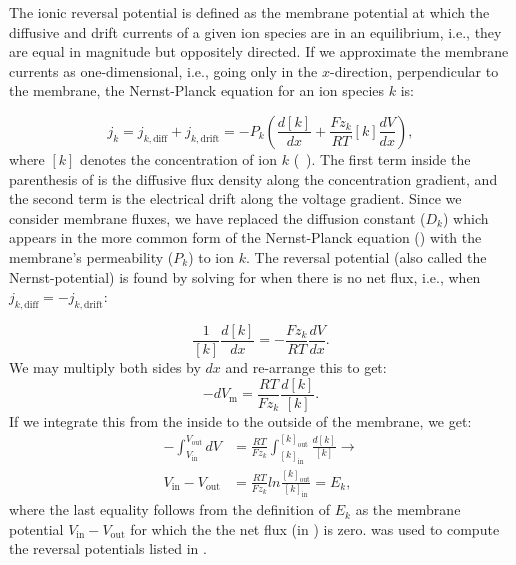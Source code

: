 The ionic reversal potential  is defined as the membrane potential at which the diffusive and drift currents of a given ion species are in an equilibrium, i.e., they are equal in magnitude but oppositely directed. If we approximate the membrane currents as one-dimensional, i.e., going only in the $x$-direction, perpendicular to the membrane, the Nernst-Planck equation for an ion species $k$ is:

\begin{equation}
j_k = j_{k,\text{diff}} + j_{k,\text{drift}} 
=  - P_k \left( \frac{d[k]}{dx} +  \frac{Fz_k}{RT}  [k] \frac{dV}{dx} \right), 
\label{eq:Neuron:NP1D}
\end{equation}
where  $[k]$ denotes the concentration of ion $k$ (\si{\milli\molar}). The first term inside the parenthesis of  is the diffusive flux density along the concentration gradient, and the second term is the electrical drift along the voltage gradient. Since we consider membrane fluxes, we have replaced the diffusion constant ($D_k$) which appears in the more common form of the Nernst-Planck equation () with the membrane's permeability ($P_k$) to ion $k$. The reversal potential (also called the Nernst-potential) is found by solving for when there is no net flux, i.e., when  $j_{k,\text{diff}} = - j_{k,\text{drift}}$:

\begin{equation}
\frac{1}{[k]} \frac{d[k]}{dx} = - \frac{Fz_k}{RT}  \frac{dV}{dx}.
\end{equation}
We may multiply both sides by $dx$ and re-arrange this to get:
\begin{equation}
-dV_\mathrm{m} = \frac{RT}{Fz_k}  \frac{d[k]}{[k]}.
\end{equation}
If we integrate this from the inside to the outside of the membrane, we get:
\begin{align}
-\int_{V_{\text{in}}}^{V_{\text{out}}}  dV &= \frac{RT}{Fz_k}  \int_{[k]_{\text{in}}}^{[k]_{\text{out}}} \frac{d[k]}{[k]} \rightarrow \\
V_{\text{in}}-V_{\text{out}} &= \frac{RT}{Fz_k} ln \frac{[k]_{\text{out}}} {[k]_{\text{in}}} = E_k, 
\label{eq:Neuron:revpots}
\end{align}
where the last equality follows from the definition of $E_k$ as the membrane potential $V_{\text{in}}-V_{\text{out}}$ for which the the net flux (in ) is zero.  was used to compute the reversal potentials listed in . 


